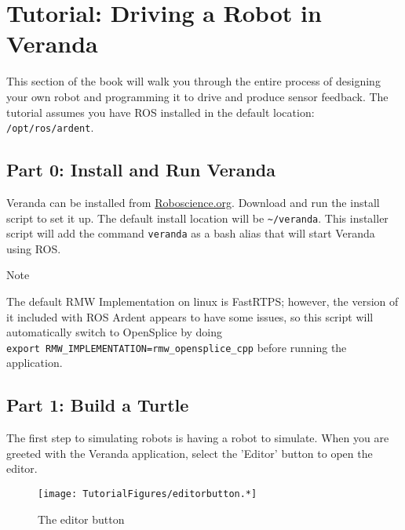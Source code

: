 \hypertarget{tutorial-1}{%
\section{Tutorial: Driving a Robot in Veranda}\label{tutorial-1}}

This section of the book will walk you through the entire process of
designing your own robot and programming it to drive and produce sensor
feedback. The tutorial assumes you have ROS installed in the default
location: \texttt{/opt/ros/ardent}.

\hypertarget{part-0-install-and-run-veranda}{%
\subsection{Part 0: Install and Run
Veranda}\label{part-0-install-and-run-veranda}}

Veranda can be installed from
\href{http://www.roboscience.org/veranda/}{Roboscience.org}. Download
and run the install script to set it up. The default install location
will be \texttt{\textasciitilde{}/veranda}. This installer script will
add the command \texttt{veranda} as a bash alias that will start Veranda
using ROS.

\begin{Shaded}
\begin{Highlighting}[]
\OperatorTok{\textgreater{}} 
\end{Highlighting}
\end{Shaded}

Note

The default RMW Implementation on linux is FastRTPS; however, the
version of it included with ROS Ardent appears to have some issues, so
this script will automatically switch to OpenSplice by doing
\texttt{export\ RMW\_IMPLEMENTATION=rmw\_opensplice\_cpp} before running
the application.

\hypertarget{part-1-build-a-turtle}{%
\subsection{Part 1: Build a Turtle}\label{part-1-build-a-turtle}}

The first step to simulating robots is having a robot to simulate. When
you are greeted with the Veranda application, select the 'Editor' button
to open the editor.

\begin{figure}
\centering
\texttt{[image: TutorialFigures/editorbutton.*]}
\caption{The editor button}
\end{figure}


